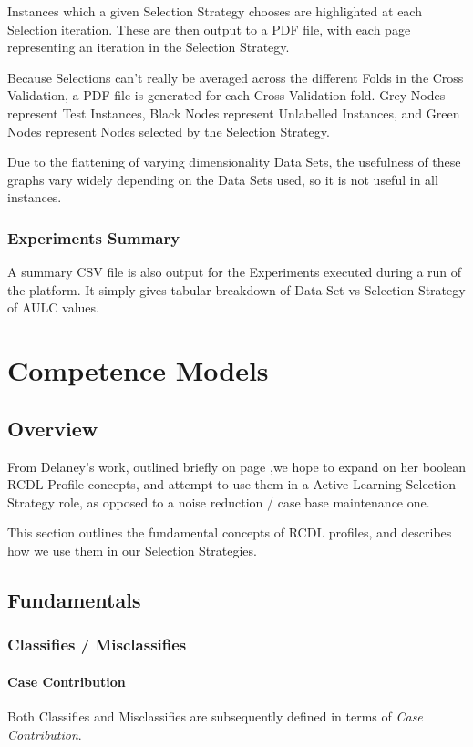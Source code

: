 \documentclass[a4paper,11pt]{report}
\begin{document}
Instances which a given Selection Strategy chooses are highlighted at each Selection iteration. These are then output to a PDF file, with each page representing an iteration in the Selection Strategy.

Because Selections can't really be averaged across the different Folds in the Cross Validation, a PDF file is generated for each Cross Validation fold. Grey Nodes represent Test Instances, Black Nodes represent Unlabelled Instances, and Green Nodes represent Nodes selected by the Selection Strategy.

Due to the flattening of varying dimensionality Data Sets, the usefulness of these graphs vary widely depending on the Data Sets used, so it is not useful in all instances.

\subsection{Experiments Summary}
A summary CSV file is also output for the Experiments executed during a run of the platform. It simply gives tabular breakdown of Data Set vs Selection Strategy of AULC values.

\chapter{Competence Models\label{cha:CompetenceModels}}
\section{Overview}
From Delaney's work\cite{Delany2009}, outlined briefly on page \pageref{sec:DelaneysWork},we hope to expand on her boolean RCDL Profile concepts, and attempt to use them in a Active Learning Selection Strategy role, as opposed to a noise reduction / case base maintenance one.

This section outlines the fundamental concepts of RCDL profiles, and describes how we use them in our Selection Strategies.

\section{Fundamentals}
\subsection{Classifies / Misclassifies}
\subsubsection{Case Contribution\label{sec:contributes}}
Both Classifies and Misclassifies are subsequently defined in terms of \emph{Case Contribution}.
\end{document}
